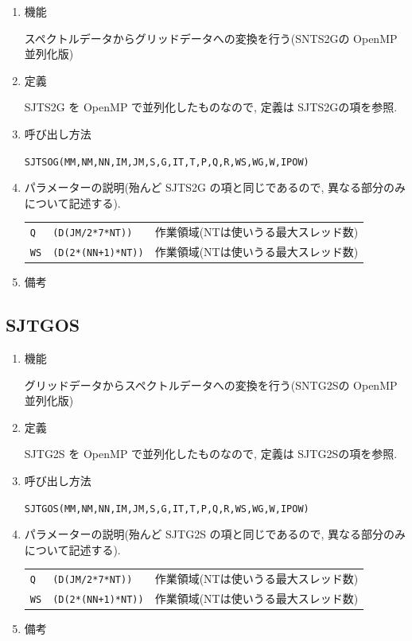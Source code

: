 \documentclass[a4j]{jarticle}
\begin{document}
\begin{enumerate}

\item 機能 

スペクトルデータからグリッドデータへの変換を行う(SNTS2Gの
OpenMP並列化版)

\item 定義

SJTS2G を OpenMP で並列化したものなので, 定義は SJTS2Gの項を参照.

\item 呼び出し方法 

{\tt SJTSOG(MM,NM,NN,IM,JM,S,G,IT,T,P,Q,R,WS,WG,W,IPOW)}

\item パラメーターの説明(殆んど SJTS2G の項と同じであるので,
異なる部分のみについて記述する).

\begin{tabular}{lll}
{\tt Q} & {\tt (D(JM/2*7*NT))} & 作業領域(NTは使いうる最大スレッド数)\\
{\tt WS} & {\tt (D(2*(NN+1)*NT))} & 作業領域(NTは使いうる最大スレッド数)\\
\end{tabular}

\item 備考

\end{enumerate}


\subsection{SJTGOS}

\begin{enumerate}

\item 機能 

グリッドデータからスペクトルデータへの変換を行う(SNTG2Sの
OpenMP並列化版)

\item 定義

SJTG2S を OpenMP で並列化したものなので, 定義は SJTG2Sの項を参照.

\item 呼び出し方法 

{\tt SJTGOS(MM,NM,NN,IM,JM,S,G,IT,T,P,Q,R,WS,WG,W,IPOW)}
  
\item パラメーターの説明(殆んど SJTG2S の項と同じであるので,
異なる部分のみについて記述する).

\begin{tabular}{lll}
{\tt Q} & {\tt (D(JM/2*7*NT))} & 作業領域(NTは使いうる最大スレッド数)\\
{\tt WS} & {\tt (D(2*(NN+1)*NT))} & 作業領域(NTは使いうる最大スレッド数)\\
\end{tabular}

\item 備考

\end{enumerate}
\end{document}
